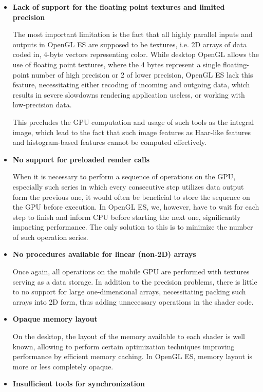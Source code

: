 \begin {itemize}
\item {\bf Lack of support for the floating point textures and limited precision}

The most important limitation is the fact that all highly parallel inputs and outputs in OpenGL ES are supposed to be textures, i.e. 2D arrays of data coded in, 4-byte vectors representing color. While desktop OpenGL allows the use of floating point textures, where the 4 bytes represent a single floating-point number of high precision or 2 of lower precision, OpenGL ES lack this feature, necessitating either recoding of incoming and outgoing data, which results in severe slowdowns rendering application useless, or working with low-precision data.

This precludes the GPU computation and usage of such tools as the integral image, which lead to the fact that such image features as Haar-like features and histogram-based features cannot be computed effectively. 
\item {\bf No support for preloaded render calls}

When it is necessary to perform a sequence of operations on the GPU, especially such series in which every consecutive step utilizes data output form the previous one, it would often be beneficial to store the sequence on the GPU before execution. In OpenGL ES, we, however, have to wait for each step to finish and inform CPU before starting the next one, significantly impacting performance. The only solution to this is to minimize the number of such operation series. 

\item {\bf No procedures available for linear (non-2D) arrays}

Once again, all operations on the mobile GPU are performed with textures serving as a data storage. In addition to the precision problems, there is little to no support for large one-dimensional arrays, necessitating packing such arrays into 2D form, thus adding unnecessary operations in the shader code. 

\item {\bf Opaque memory layout}

On the desktop, the layout of the memory available to each shader is well known, allowing to perform certain optimization techniques improving performance by efficient memory caching. In OpenGL ES, memory layout is more or less completely opaque. 

\item {\bf Insufficient tools for synchronization}


\end{itemize}

